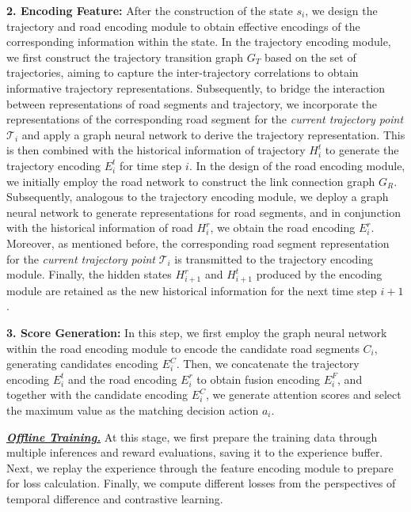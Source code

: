 \textbf{2. Encoding Feature:} After the construction of the state $s_i$, we design the trajectory and road encoding module to obtain effective encodings of the corresponding information within the state. In the trajectory encoding module, we first construct the trajectory transition graph $G_T$ based on the set of trajectories, aiming to capture the inter-trajectory correlations to obtain informative trajectory representations. Subsequently, to bridge the interaction between representations of road segments and trajectory, we incorporate the representations of the corresponding road segment for the \textit{current trajectory point} $\mathcal{T}_i$ and apply a graph neural network to derive the trajectory representation. This is then combined with the historical information of trajectory $H_i^t$ to generate the trajectory encoding $E_i^t$ for time step $i$. In the design of the road encoding module, we initially employ the road network to construct the link connection graph $G_R$. Subsequently, analogous to the trajectory encoding module, we deploy a graph neural network to generate representations for road segments, and in conjunction with the historical information of road $H_i^r$, we obtain the road encoding $E_i^r$. Moreover, as mentioned before, the corresponding road segment representation for the \textit{current trajectory point} $\mathcal{T}_i$ is transmitted to the trajectory encoding module. Finally, the hidden states $H_{i+1}^r$ and $H_{i+1}^t$ produced by the encoding module are retained as the new historical information for the next time step $i+1$.

\textbf{3. Score Generation:} In this step, we first employ the graph neural network within the road encoding module to encode the candidate road segments $C_i$, generating candidates encoding $E_i^C$. Then, we concatenate the trajectory encoding $E_i^t$ and the road encoding $E_i^r$ to obtain fusion encoding $E_i^F$, and together with the candidate encoding $E_i^C$, we generate attention scores and select the maximum value as the matching decision action $a_i$.


\noindent \underline{\textit{\textbf{Offline Training.}}} At this stage, we first prepare the training data through multiple inferences and reward evaluations, saving it to the experience buffer. Next, we replay the experience through the feature encoding module to prepare for loss calculation. Finally, we compute different losses from the perspectives of temporal difference and contrastive learning.

